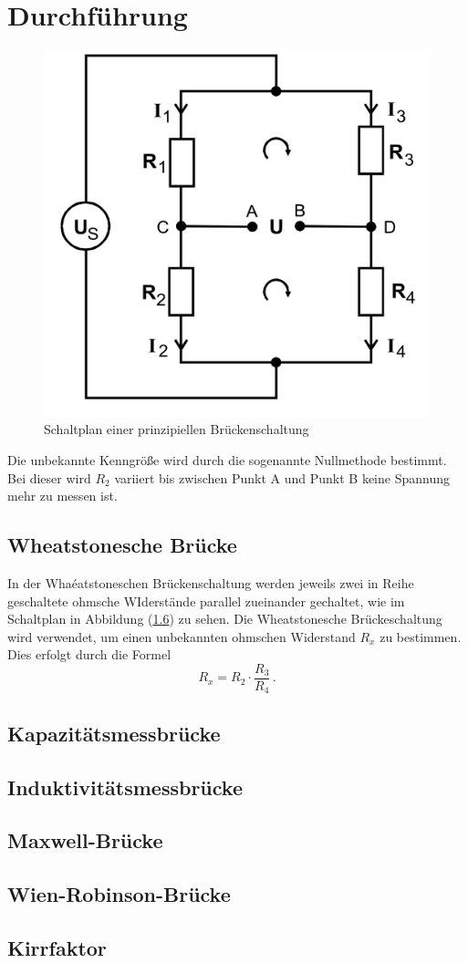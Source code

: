     \section{Durchführung}
\label{sec:Durchführung}
\begin{figure}[H]
    \centering
    \includegraphics[width=0.4\linewidth]{prinzipielle_Schaltung.png}
    \caption{Schaltplan einer prinzipiellen Brückenschaltung}
    \label{pic:prinzipielle_Brückenschaltung}
\end{figure}
Die unbekannte Kenngröße wird durch die sogenannte Nullmethode bestimmt. Bei dieser wird $R_2$ variiert bis zwischen Punkt A und Punkt B keine Spannung mehr zu
messen ist. 
\subsection{Wheatstonesche Brücke}
In der Whaéatstoneschen Brückenschaltung werden jeweils zwei in Reihe geschaltete ohmsche WIderstände parallel zueinander gechaltet, wie im Schaltplan in Abbildung 
(\ref{}) zu sehen. 
Die Wheatstonesche Brückeschaltung wird verwendet, um einen unbekannten ohmschen Widerstand $R_x$ zu bestimmen. Dies erfolgt durch die Formel 
\begin{equation}
    \label{eqn:Wheatstone_R}
    R_x = R_2 \cdot \frac{R_3}{R_4} \,.
\end{equation}
\subsection{Kapazitätsmessbrücke}
\subsection{Induktivitätsmessbrücke}
\subsection{Maxwell-Brücke}
\subsection{Wien-Robinson-Brücke}
\subsection{Kirrfaktor}




